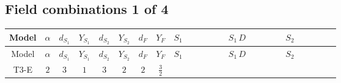 \documentclass[8pt]{article}
\begin{document}
\begin{landscape}
\subsection*{Field combinations 1 of 4}
\begin{longtable}{@{}cccccccc >{\raggedright\arraybackslash}p{0.21\linewidth} >{\raggedright\arraybackslash}p{0.21\linewidth} >{\raggedright\arraybackslash}p{0.21\linewidth}@{}}
\toprule
Model & $\alpha$ & $d_{S_1}$ & $Y_{S_1}$ & $d_{S_2}$ & $Y_{S_2}$ & $d_F$ & $Y_F$ & $S_1$ & $S_1\,D$ & $S_2$ \\
\midrule
\endfirsthead
\toprule
Model & $\alpha$ & $d_{S_1}$ & $Y_{S_1}$ & $d_{S_2}$ & $Y_{S_2}$ & $d_F$ & $Y_F$ & $S_1$ & $S_1\,D$ & $S_2$ \\
\midrule
\endhead
T3-E & $2$ & $3$ & $1$ & $3$ & $2$ & $2$ & $\frac{3}{2}$ & \scriptsize\adjustbox{max width=\linewidth}{$\begin{gathered} -S_{1,j_1} S_{1,j_1}{}^{\dagger } m_1^2 \\ +\frac{1}{2} S_{1,j_3} S_{1,j_4} S_{1,j_1}{}^{\dagger } S_{1,j_2}{}^{\dagger } \mathcal{I}_{S_1,j_1,j_3,j_2,j_4}{}^1 \lambda_{S_1}^{(1)}^{(1)} \\ +\frac{1}{2} S_{1,j_3} S_{1,j_4} S_{1,j_1}{}^{\dagger } S_{1,j_2}{}^{\dagger } \mathcal{I}_{S_1,j_1,j_3,j_2,j_4}{}^2 \lambda_{S_1}^{(1)}^{(2)}\end{gathered}$} & \scriptsize\adjustbox{max width=\linewidth}{$\begin{gathered} +D_{\mu _1}\left(S_{1,j_1}\right){}^{\dagger } D_{\mu _1}\left(S_{1,j_1}\right)\end{gathered}$} & \scriptsize\adjustbox{max width=\linewidth}{$\begin{gathered} -m_2^2 S_{2,j_1} S_{2,j_1}{}^{\dagger } \\ +\frac{1}{2} S_{2,j_3} S_{2,j_4} S_{2,j_1}{}^{\dagger } S_{2,j_2}{}^{\dagger } \mathcal{I}_{S_2,j_1,j_3,j_2,j_4}{}^1 \lambda_{S_2}^{(1)}^{(1)} \\ +\frac{1}{2} S_{2,j_3} S_{2,j_4} S_{2,j_1}{}^{\dagger } S_{2,j_2}{}^{\dagger } \mathcal{I}_{S_2,j_1,j_3,j_2,j_4}{}^2 \lambda_{S_2}^{(1)}^{(2)}\end{gathered}$} \\
\midrule
\bottomrule
\end{longtable}
\clearpage

\end{landscape}
\end{document}
